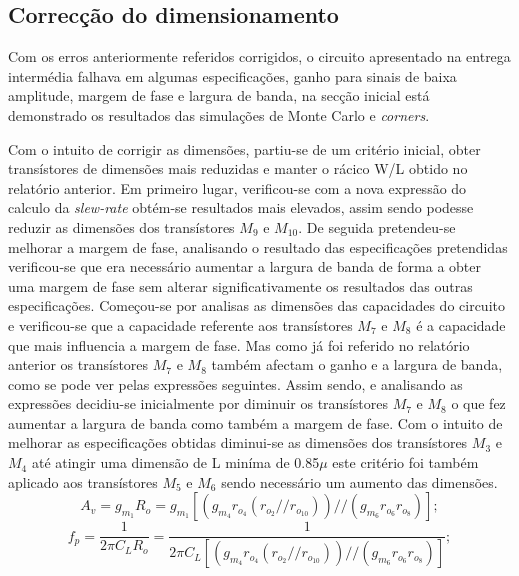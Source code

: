 \documentclass[11pt]{article}
\numberwithin{equation}{section}
\begin{document}
\subsection{Correcção do dimensionamento}

Com os erros anteriormente referidos corrigidos, o circuito apresentado na entrega intermédia falhava em algumas especificações, ganho para sinais de baixa amplitude, margem de fase e largura de banda, na secção inicial está demonstrado os resultados das simulações de Monte Carlo e \textit{corners}.

Com o intuito de corrigir as dimensões, partiu-se de um critério inicial, obter transístores de dimensões mais reduzidas e manter o rácico W/L obtido no relatório anterior. Em primeiro lugar, verificou-se com a nova expressão do calculo da \textit{slew-rate} obtém-se resultados mais elevados, assim sendo podesse reduzir as dimensões dos transístores $M_9$ e $M_{10}$. De seguida pretendeu-se melhorar a margem de fase, analisando o resultado das especificações pretendidas verificou-se que era necessário aumentar a largura de banda de forma a obter uma margem de fase sem alterar significativamente os resultados das outras especificações. Começou-se por analisas as dimensões das capacidades do circuito e verificou-se que a capacidade referente aos transístores $M_7$ e $M_8$ é a capacidade que mais influencia a margem de fase. Mas como já foi referido no relatório anterior os transístores $M_7$ e $M_8$ também afectam o ganho e a largura de banda, como se pode ver pelas expressões seguintes. Assim sendo, e analisando as expressões decidiu-se inicialmente por diminuir os  transístores $M_7$ e $M_8$ o que fez aumentar a largura de banda como também a margem de fase. Com o intuito de melhorar as especificações obtidas diminui-se as dimensões dos transístores $M_3$ e $M_4$ até atingir uma dimensão de L miníma de 0.85$\mu$ este critério foi também aplicado aos transístores  $M_5$ e $M_6$ sendo necessário um aumento das dimensões.
\vspace{-3mm}
\begin{equation}
A_{v} = g_{m_1} R_o =  g_{m_1}\left[\left(g_{m_4}r_{o_4}\left(r_{o_2}//r_{o_{10}}\right)\right)//\left(g_{m_6}r_{o_6}r_{o_8}\right)\right];
\end{equation}
\vspace{-2mm}
\begin{equation}
f_{p} = \frac{1}{2\pi C_L R_o} = \frac{1}{2\pi C_L \left[\left(g_{m_4}r_{o_4}\left(r_{o_2}//r_{o_{10}}\right)\right)//\left(g_{m_6}r_{o_6}r_{o_8}\right)\right]};
\end{equation} 
\end{document}
